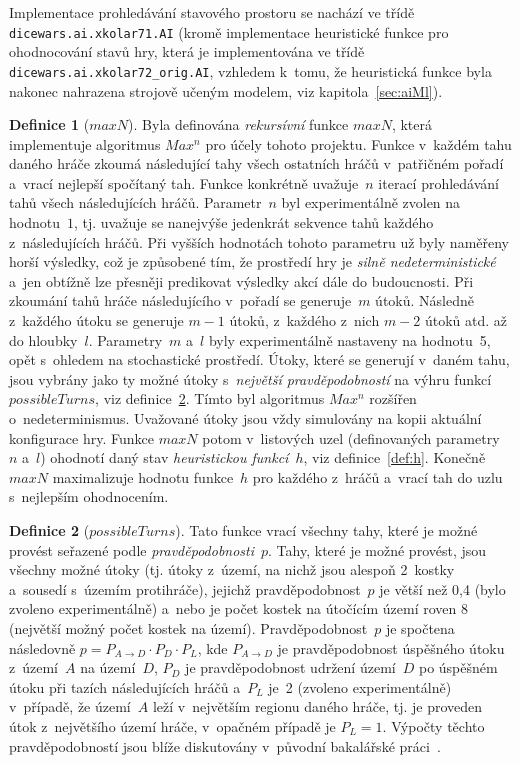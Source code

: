 \documentclass[11pt, a4paper]{article}
\theoremstyle{definition}
\newtheorem{definition}{Definice}[section]
\begin{document}
Implementace prohledávání stavového prostoru se nachází ve třídě
\texttt{dicewars.ai.xkolar71.AI} (kromě implementace heuristické funkce
pro ohodnocování stavů hry, která je implementována ve třídě
\texttt{dicewars.ai.xkolar72\_orig.AI}, vzhledem k~tomu, že heuristická funkce
byla nakonec nahrazena strojově učeným modelem, viz kapitola~\ref{sec:aiMl}).

\begin{definition}[$ maxN $]
Byla definována \emph{rekursívní} funkce $ maxN $, která implementuje
algoritmus $ Max^n $ pro účely tohoto projektu. Funkce v~každém tahu daného
hráče zkoumá následující tahy všech ostatních hráčů v~patřičném pořadí
a~vrací nejlepší spočítaný tah. Funkce konkrétně uvažuje~$ n $ iterací
prohledávání tahů všech následujících hráčů. Parametr~$ n $ byl
experimentálně zvolen na hodnotu~$ 1 $, tj. uvažuje se nanejvýše jedenkrát
sekvence tahů každého z~následujících hráčů. Při vyšších hodnotách tohoto
parametru už byly naměřeny horší výsledky, což je způsobené tím, že prostředí
hry je \emph{silně nedeterministické} a~jen obtížně lze přesněji predikovat
výsledky akcí dále do budoucnosti. Při zkoumání tahů hráče následujícího
v~pořadí se generuje~$ m $ útoků. Následně z~každého útoku se generuje
$ m - 1 $ útoků, z~každého z~nich $ m - 2 $ útoků atd. až do hloubky~$ l $.
Parametry~$ m $ a~$ l $ byly experimentálně nastaveny na hodnotu~5, opět
s~ohledem na stochastické prostředí. Útoky, které se generují v~daném
tahu, jsou vybrány jako ty možné útoky s~\emph{největší pravděpodobností} na
výhru funkcí $ possibleTurns $, viz definice~\ref{def:possTurns}. Tímto
byl algoritmus $ Max^n $ rozšířen o~nedeterminismus. Uvažované útoky jsou
vždy simulovány na kopii aktuální konfigurace hry. Funkce $ maxN $ potom
v~listových uzel (definovaných parametry~$ n $ a~$ l $) ohodnotí daný stav
\emph{heuristickou funkcí}~$ h $, viz definice~\ref{def:h}. Konečně $ maxN $
maximalizuje hodnotu funkce~$ h $ pro každého z~hráčů a~vrací tah do uzlu
s~nejlepším ohodnocením.
\end{definition}

\begin{definition}[$ possibleTurns $]
\label{def:possTurns}
Tato funkce vrací všechny tahy, které je možné provést seřazené podle
\emph{pravděpodobnosti}~$ p $. Tahy, které je možné provést, jsou
všechny možné útoky (tj. útoky z~území, na nichž jsou alespoň 2~kostky
a~sousedí s~územím protihráče), jejichž pravděpodobnost~$ p $
je větší než 0,4 (bylo zvoleno experimentálně) a~nebo je počet kostek
na útočícím území roven 8 (největší možný počet kostek na území).
Pravděpodobnost~$ p $ je spočtena následovně $ p = P_{A \rightarrow D}
\cdot P_D \cdot P_L $, kde $ P_{A \rightarrow D} $ je pravděpodobnost
úspěšného útoku z~území~$ A $ na území~$ D $, $ P_D $ je pravděpodobnost
udržení území~$ D $ po úspěšném útoku při tazích následujících hráčů
a~$ P_L $ je~2 (zvoleno experimentálně) v~případě, že území~$ A $ leží
v~největším regionu daného hráče, tj. je proveden útok z~největšího území
hráče, v~opačném případě je $ P_L = 1 $. Výpočty těchto pravděpodobností
jsou blíže diskutovány v~původní bakalářské práci~\cite{turecekBP}.
\end{definition}
\end{document}
